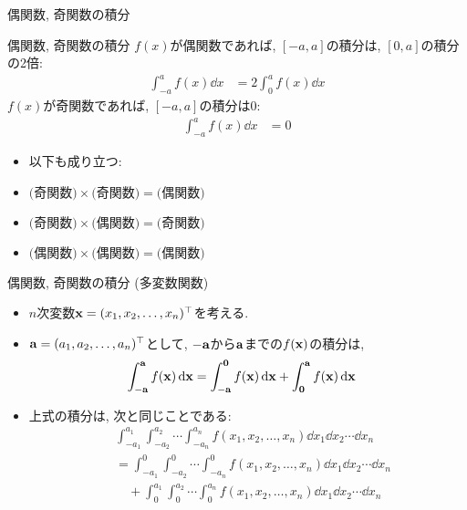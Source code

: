 \documentclass[dvipdfmx,notheorems,t]{beamer}
\begin{document}
\begin{frame}{偶関数, 奇関数の積分}
\begin{block}{偶関数, 奇関数の積分}
  $f(x)$が偶関数であれば, $[-a, a]$の積分は, $[0, a]$の積分の2倍:
  \begin{align*}
    \int_{-a}^a f(x) \dd{x} &= 2 \int_0^a f(x) \dd{x}
  \end{align*}
  $f(x)$が奇関数であれば, $[-a, a]$の積分は$0$:
  \begin{align*}
    \int_{-a}^a f(x) \dd{x} &= 0
  \end{align*}
\end{block}

\begin{itemize}
  \item 以下も成り立つ:
  \item $\text{(奇関数)} \times \text{(奇関数)} = \text{(偶関数)}$
  \item $\text{(奇関数)} \times \text{(偶関数)} = \text{(奇関数)}$
  \item $\text{(偶関数)} \times \text{(偶関数)} = \text{(偶関数)}$
\end{itemize}
\end{frame}

\begin{frame}{偶関数, 奇関数の積分 (多変数関数)}
\begin{itemize}
  \item $n$次変数$\vb{x} = (x_1, x_2, \ldots, x_n)^\top$を考える.
  \item $\vb{a} = (a_1, a_2, \ldots, a_n)^\top$として, $-\vb{a}$から$\vb{a}$までの$f(\vb{x})$の積分は,
  \begin{align*}
    \int_{-\vb{a}}^{\vb{a}} f(\vb{x}) \dd{\vb{x}}
      &= \int_{-\vb{a}}^{\vb{0}} f(\vb{x}) \dd{\vb{x}}
        + \int_{\vb{0}}^{\vb{a}} f(\vb{x}) \dd{\vb{x}}
  \end{align*}
  \item 上式の積分は, 次と同じことである:
  \begin{align*}
    & \int_{-a_1}^{a_1} \int_{-a_2}^{a_2} \cdots \int_{-a_n}^{a_n} f(x_1, x_2, \ldots, x_n)
      \dd{x_1} \dd{x_2} \cdots \dd{x_n} \\
    &= \int_{-a_1}^0 \int_{-a_2}^0 \cdots \int_{-a_n}^0 f(x_1, x_2, \ldots, x_n)
      \dd{x_1} \dd{x_2} \cdots \dd{x_n} \\
    & \quad + \int_0^{a_1} \int_0^{a_2} \cdots \int_0^{a_n} f(x_1, x_2, \ldots, x_n)
      \dd{x_1} \dd{x_2} \cdots \dd{x_n}
  \end{align*}
\end{itemize}
\end{frame}
\end{document}

